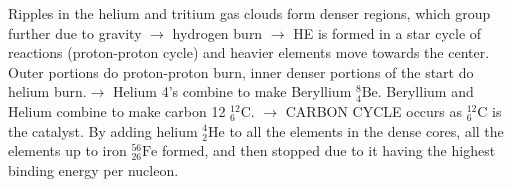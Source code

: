 \documentclass{report}
\begin{document}




{
	Ripples in the helium and tritium gas clouds form denser regions, which group further due to gravity $\rightarrow$ hydrogen burn $\rightarrow$ HE is formed in a star cycle of reactions (proton-proton cycle) and heavier elements move
	towards the center. Outer portions do proton-proton burn, inner denser portions of the start do helium burn.$\rightarrow$ Helium 4's combine to make Beryllium $^8_4\text{Be}$. Beryllium and Helium combine to make carbon 12 $^{12}_6\text{C}$. $\rightarrow$ CARBON CYCLE occurs as $^{12}_6\text{C}$ is the catalyst.
	By adding helium $^4_2\text{He}$ to all the elements in the dense cores, all the elements up to iron $^{56}_{26}\text{Fe}$ formed, and then stopped due to it having the highest binding energy per nucleon.
}
\end{document}
